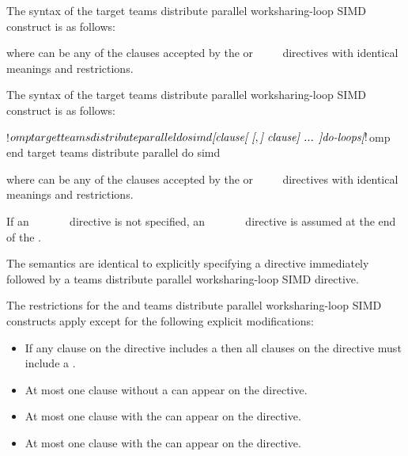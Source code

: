 \syntax
\begin{ccppspecific}
The syntax of the target teams distribute parallel worksharing-loop SIMD construct is as follows:

\begin{ompcPragma}
#pragma omp target teams distribute parallel for simd \plc{\}
            \plc{[clause[ [},\plc{] clause] ... ] new-line}
    \plc{for-loops}
\end{ompcPragma}

where  can be any of the clauses accepted by the  or
~~~~
directives with identical meanings and restrictions.
\end{ccppspecific}

\begin{fortranspecific}
The syntax of the target teams distribute parallel worksharing-loop SIMD construct is as follows:

\begin{ompfPragma}
!$omp target teams distribute parallel do simd \plc{[clause[ [},\plc{] clause] ... ]}
    \plc{do-loops}
\plc{[}!$omp end target teams distribute parallel do simd\plc{]}
\end{ompfPragma}

where  can be any of the clauses accepted by the
 or ~~~~
directives with identical meanings and restrictions.

If an ~~~~~~
directive is not specified, an
~~~~~~
directive is assumed at the end of the .
\end{fortranspecific}

\descr
The semantics are identical to explicitly specifying a 
directive immediately followed by a teams distribute parallel worksharing-loop
SIMD directive. 


\restrictions
The restrictions for the  and teams distribute parallel
worksharing-loop SIMD constructs apply except for the following explicit modifications:

\begin{itemize}
\item If any  clause on the directive includes a
       then all  clauses
      on the directive must include a .

\item At most one  clause without a
       can appear on the directive.

\item At most one  clause with the 
       can appear on the directive.

\item At most one  clause with the 
       can appear on the directive.
\end{itemize}


